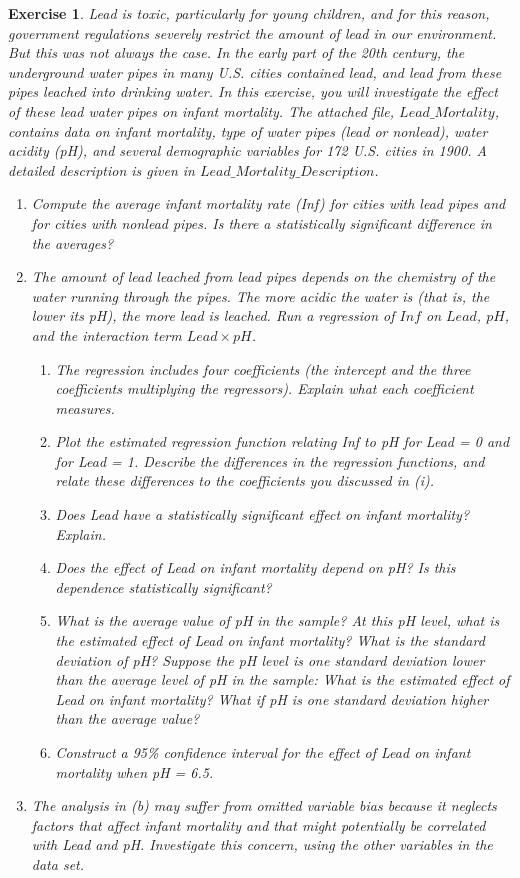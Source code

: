 \documentclass{article}
\newtheorem{exercise}[theorem]{Exercise}
\begin{document}
\begin{exercise}
Lead is toxic, particularly for young children, and for this reason, government regulations severely restrict the amount of lead in our environment. But this was not always the case. In the early part of the 20th century, the underground water pipes in many U.S. cities contained lead, and lead from these pipes leached into drinking water. In this exercise, you will investigate the effect of these lead water pipes on infant mortality. The attached file, $Lead\_Mortality$, contains data on infant mortality, type of water pipes (lead or nonlead), water acidity (pH), and several demographic variables for 172 U.S. cities in 1900. A detailed description is given in $Lead\_Mortality\_Description$.

\begin{enumerate}[label=(\alph*)]
    \item Compute the average infant mortality rate (Inf) for cities with lead pipes and for cities with nonlead pipes. Is there a statistically significant difference in the averages?
    \item The amount of lead leached from lead pipes depends on the chemistry of the water running through the pipes. The more acidic the water is (that is, the lower its pH), the more lead is leached. Run a regression of $Inf$ on $Lead$, $pH$, and the interaction term $Lead \times pH$.
    \begin{enumerate}[label=\roman* --]
        \item The regression includes four coefficients (the intercept and the three coefficients multiplying the regressors). Explain what each coefficient measures.
        \item Plot the estimated regression function relating Inf to pH for Lead = 0 and for Lead = 1. Describe the differences in the regression functions, and relate these differences to the coefficients you discussed in (i).
        \item Does Lead have a statistically significant effect on infant mortality? Explain.
        \item Does the effect of Lead on infant mortality depend on pH? Is this dependence statistically significant?
        \item What is the average value of pH in the sample? At this pH level, what is the estimated effect of Lead on infant mortality? What is the standard deviation of pH? Suppose the pH level is one standard deviation lower than the average level of pH in the sample: What is the estimated effect of Lead on infant mortality? What if pH is one standard deviation higher than the average value?
        \item Construct a 95\% confidence interval for the effect of Lead on infant mortality when pH = 6.5.
    \end{enumerate}
    \item The analysis in (b) may suffer from omitted variable bias because it neglects factors that affect infant mortality and that might potentially be correlated with Lead and pH. Investigate this concern, using the other variables in the data set.
\end{enumerate}


\end{exercise}
\end{document}
